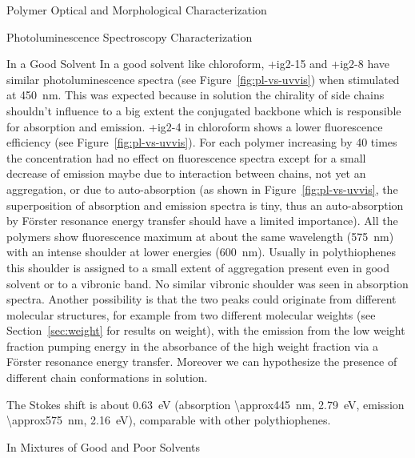 \begin{section}{Polymer Optical and Morphological Characterization}
\begin{subsection}{Photoluminescence Spectroscopy Characterization}
\begin{subsubsection}{In a Good Solvent}
In a good solvent like chloroform, \cmpd+{ig2-15} and \cmpd+{ig2-8} have similar photoluminescence spectra (see Figure~\ref{fig:pl-vs-uvvis}) when stimulated at \SI{450}{\nm}. This was expected because in solution the chirality of side chains shouldn't influence to a big extent the conjugated backbone which is responsible for absorption and emission. 
\cmpd+{ig2-4} in chloroform shows a lower fluorescence efficiency (see Figure~\ref{fig:pl-vs-uvvis}).
For each polymer increasing by 40 times the concentration had no effect on fluorescence spectra except for a small decrease of emission maybe due to interaction between chains, not yet an aggregation, or due to auto-absorption (as shown in Figure~\ref{fig:pl-vs-uvvis}, the superposition of absorption and emission spectra is tiny, thus an auto-absorption by F\"{o}rster resonance energy transfer should have a limited importance). 
All the polymers show fluorescence maximum at about the same wavelength (\SI{575}{\nm}) with an intense shoulder at lower energies (\SI{600}{\nm}). Usually in poly\-thio\-phenes this shoulder is assigned to a small extent of aggregation present even in good solvent or to a vibronic band. No similar vibronic shoulder was seen in absorption spectra. Another possibility is that the two peaks could originate from different molecular structures, for example from two different molecular weights (see Section~\ref{sec:weight} for results on weight), with the emission from the low weight fraction pumping energy in the absorbance of the high weight fraction via a F\"{o}rster resonance energy transfer. Moreover we can hypothesize the presence of different chain conformations in solution. 

The Stokes shift 
is about \SI{0.63}{\eV} (absorption \SI{\approx445}{\nm}, \SI{2.79}{\eV}, emission \SI{\approx575}{\nm}, \SI{2.16}{\eV}), comparable with other poly\-thio\-phenes.

\end{subsubsection}
\begin{subsubsection}{In Mixtures of Good and Poor Solvents}


\end{subsubsection}
\end{subsection}
\end{section}
